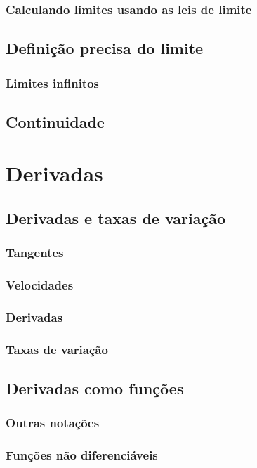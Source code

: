 \subsubsection{Calculando limites usando as leis de limite}

\subsection{Definição precisa do limite}
\subsubsection{Limites infinitos}
\subsection{Continuidade}

\section{Derivadas}
\subsection{Derivadas e taxas de variação}
\subsubsection{Tangentes}
\subsubsection{Velocidades}
\subsubsection{Derivadas}
\subsubsection{Taxas de variação}
\subsection{Derivadas como funções}
\subsubsection{Outras notações}
\subsubsection{Funções não diferenciáveis}
